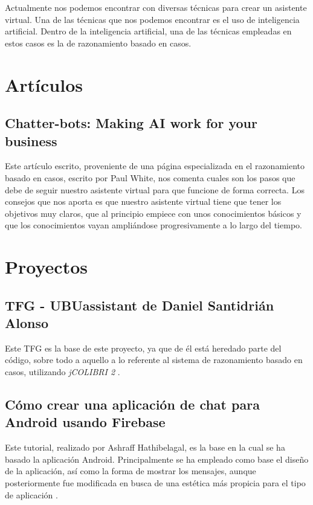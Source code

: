 
Actualmente nos podemos encontrar con diversas técnicas para crear un asistente virtual. Una de las técnicas que nos podemos encontrar es el uso de inteligencia artificial. Dentro de la inteligencia artificial, una de las técnicas empleadas en estos casos es la de razonamiento basado en casos.

\section{Artículos}
\subsection{Chatter-bots: Making AI work for your business}
Este artículo escrito, proveniente de una página especializada en el razonamiento basado en casos, escrito por Paul White, nos comenta cuales son los pasos que debe de seguir nuestro asistente virtual para que funcione de forma correcta. Los consejos que nos aporta es que nuestro asistente virtual tiene que tener los objetivos muy claros, que al principio empiece con unos conocimientos básicos y que los conocimientos vayan ampliándose progresivamente a lo largo del tiempo.

\section{Proyectos}
\subsection{TFG - UBUassistant de Daniel Santidrián Alonso}
Este TFG es la base de este proyecto, ya que de él está heredado parte del código, sobre todo a aquello a lo referente al sistema de razonamiento basado en casos, utilizando \emph{jCOLIBRI 2} \cite{tfg:git}.

\subsection{Cómo crear una aplicación de chat para Android usando Firebase}
Este tutorial, realizado por Ashraff Hathibelagal, es la base en la cual se ha basado la aplicación Android. Principalmente se ha empleado como base el diseño de la aplicación, así como la forma de mostrar los mensajes, aunque posteriormente fue modificada en busca de una estética más propicia para el tipo de aplicación \cite{chat:tut}.
